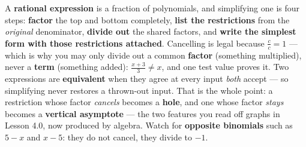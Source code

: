 \documentclass[10pt]{article}
\begin{document}
\vspace{0.10in}

\begin{remindbox}
\small A \textbf{rational expression} is a fraction of polynomials, and simplifying one is four steps:
\textbf{factor} the top and bottom completely, \textbf{list the restrictions} from the
\emph{original} denominator, \textbf{divide out} the shared factors, and \textbf{write the simplest
form with those restrictions attached}. Cancelling is legal because $\frac{c}{c}=1$ --- which is why
you may only divide out a common \textbf{factor} (something multiplied), never a \textbf{term}
(something added): $\frac{x+3}{3}\neq x$, and one test value proves it. Two expressions are
\textbf{equivalent} when they agree at every input \emph{both} accept --- so simplifying never
restores a thrown-out input. That is the whole point: a restriction whose factor \emph{cancels}
becomes a \textbf{hole}, and one whose factor \emph{stays} becomes a \textbf{vertical asymptote} ---
the two features you read off graphs in Lesson 4.0, now produced by algebra. Watch for
\textbf{opposite binomials} such as $5-x$ and $x-5$: they do not cancel, they divide to $-1$.
\end{remindbox}
\end{document}
